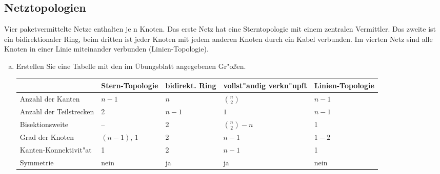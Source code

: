 \setcounter{section}{1}
\setcounter{subsection}{1} %
\subsection{Netztopologien}

Vier paketvermittelte Netze enthalten je n Knoten. Das erste Netz hat eine
Sterntopologie mit einem zentralen Vermittler. Das zweite ist ein
bidirektionaler Ring, beim dritten ist jeder Knoten mit jedem anderen Knoten
durch ein Kabel verbunden. Im vierten Netz sind alle Knoten in einer Linie miteinander
verbunden (Linien-Topologie).

\begin{enumerate}[(a)]
        \item Erstellen Sie eine Tabelle mit den im Übungsblatt angegebenen Gr"o{\ss}en.

            \begin{table*}[h]
                \centering
                \bgroup
                \def\arraystretch{1.5}%
                \begin{tabularx}{\textwidth}{|V{4cm}|*4{f|}}
                    \hline
                                            & Stern-Topologie & bidirekt. Ring & vollst"andig verkn"upft & Linien-Topologie \\ \hline
                    Anzahl der Kanten       & $n - 1$         & $n$            & $\binom{n}{2}$          & $n - 1$          \\ \hline
                    Anzahl der Teilstrecken & 2               & $n - 1$        & $1$                     & $n - 1$          \\ \hline
                    Bisektionsweite         & --              & 2              & $\binom{n}{2} - n$      & 1                \\ \hline
                    Grad der Knoten         & $(n - 1)$, $1$  & 2              & $n - 1$                 & $1-2$            \\ \hline
                    Kanten-Konnektivit"at   & 1               & 2              & $n - 1$                 & 1                \\ \hline
                    Symmetrie               & nein            & ja             & ja                      & nein             \\ \hline
                \end{tabularx}
                \egroup
            \end{table*}


\end{enumerate}
